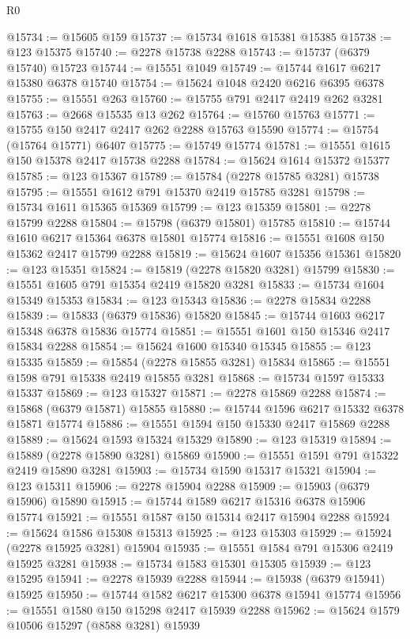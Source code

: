 \begin{lexlean}{R0}
\begin{coremodule}
@15734 := @15605 @159
@15737 := @15734 @1618 @15381 @15385
@15738 := @123 @15375
@15740 := @2278 @15738 @2288
@15743 := @15737 (@6379 @15740) @15723
@15744 := @15551 @1049
@15749 := @15744 @1617 @6217 @15380 @6378 @15740
@15754 := @15624 @1048 @2420 @6216 @6395 @6378
@15755 := @15551 @263
@15760 := @15755 @791 @2417 @2419 @262 @3281
@15763 := @2668 @15535 @13 @262
@15764 := @15760 @15763
@15771 := @15755 @150 @2417 @2417 @262 @2288 @15763 @15590
@15774 := @15754 (@15764 @15771) @6407
@15775 := @15749 @15774
@15781 := @15551 @1615 @150 @15378 @2417 @15738 @2288
@15784 := @15624 @1614 @15372 @15377
@15785 := @123 @15367
@15789 := @15784 (@2278 @15785 @3281) @15738
@15795 := @15551 @1612 @791 @15370 @2419 @15785 @3281
@15798 := @15734 @1611 @15365 @15369
@15799 := @123 @15359
@15801 := @2278 @15799 @2288
@15804 := @15798 (@6379 @15801) @15785
@15810 := @15744 @1610 @6217 @15364 @6378 @15801 @15774
@15816 := @15551 @1608 @150 @15362 @2417 @15799 @2288
@15819 := @15624 @1607 @15356 @15361
@15820 := @123 @15351
@15824 := @15819 (@2278 @15820 @3281) @15799
@15830 := @15551 @1605 @791 @15354 @2419 @15820 @3281
@15833 := @15734 @1604 @15349 @15353
@15834 := @123 @15343
@15836 := @2278 @15834 @2288
@15839 := @15833 (@6379 @15836) @15820
@15845 := @15744 @1603 @6217 @15348 @6378 @15836 @15774
@15851 := @15551 @1601 @150 @15346 @2417 @15834 @2288
@15854 := @15624 @1600 @15340 @15345
@15855 := @123 @15335
@15859 := @15854 (@2278 @15855 @3281) @15834
@15865 := @15551 @1598 @791 @15338 @2419 @15855 @3281
@15868 := @15734 @1597 @15333 @15337
@15869 := @123 @15327
@15871 := @2278 @15869 @2288
@15874 := @15868 (@6379 @15871) @15855
@15880 := @15744 @1596 @6217 @15332 @6378 @15871 @15774
@15886 := @15551 @1594 @150 @15330 @2417 @15869 @2288
@15889 := @15624 @1593 @15324 @15329
@15890 := @123 @15319
@15894 := @15889 (@2278 @15890 @3281) @15869
@15900 := @15551 @1591 @791 @15322 @2419 @15890 @3281
@15903 := @15734 @1590 @15317 @15321
@15904 := @123 @15311
@15906 := @2278 @15904 @2288
@15909 := @15903 (@6379 @15906) @15890
@15915 := @15744 @1589 @6217 @15316 @6378 @15906 @15774
@15921 := @15551 @1587 @150 @15314 @2417 @15904 @2288
@15924 := @15624 @1586 @15308 @15313
@15925 := @123 @15303
@15929 := @15924 (@2278 @15925 @3281) @15904
@15935 := @15551 @1584 @791 @15306 @2419 @15925 @3281
@15938 := @15734 @1583 @15301 @15305
@15939 := @123 @15295
@15941 := @2278 @15939 @2288
@15944 := @15938 (@6379 @15941) @15925
@15950 := @15744 @1582 @6217 @15300 @6378 @15941 @15774
@15956 := @15551 @1580 @150 @15298 @2417 @15939 @2288
@15962 := @15624 @1579 @10506 @15297 (@8588 @3281) @15939

\end{coremodule}
\end{lexlean}
